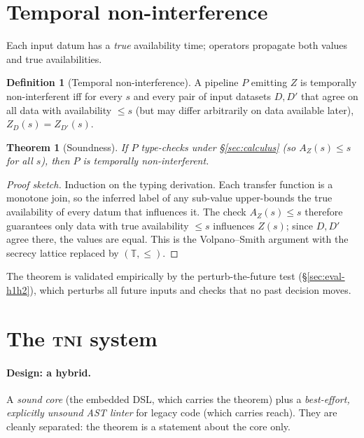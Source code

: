 \documentclass[11pt]{article}
\newcommand{\tni}{\textsc{tni}}
\theoremstyle{plain}
\newtheorem{theorem}{Theorem}
\theoremstyle{definition}
\newtheorem{definition}{Definition}
\begin{document}
\section{Temporal non-interference}\label{sec:theory}

Each input datum has a \emph{true} availability time; operators propagate both
values and true availabilities.

\begin{definition}[Temporal non-interference]
A pipeline $P$ emitting $Z$ is temporally non-interferent iff for every $s$ and
every pair of input datasets $D,D'$ that agree on all data with availability
$\le s$ (but may differ arbitrarily on data available later), $Z_D(s)=Z_{D'}(s)$.
\end{definition}

\begin{theorem}[Soundness]
If $P$ type-checks under \S\ref{sec:calculus} (so $A_Z(s)\le s$ for all $s$),
then $P$ is temporally non-interferent.
\end{theorem}

\begin{proof}[Proof sketch]
Induction on the typing derivation. Each transfer function is a monotone join, so
the inferred label of any sub-value upper-bounds the true availability of every
datum that influences it. The check $A_Z(s)\le s$ therefore guarantees only data
with true availability $\le s$ influences $Z(s)$; since $D,D'$ agree there, the
values are equal. This is the Volpano--Smith argument
\citep{volpano1996sound} with the secrecy lattice replaced by
$(\mathbb{T},\le)$.
\end{proof}

The theorem is validated empirically by the perturb-the-future test
(\S\ref{sec:eval-h1h2}), which perturbs all future inputs and checks that no past
decision moves.

\section{The \textmd{\tni} system}\label{sec:system}

\paragraph{Design: a hybrid.}
A \emph{sound core} (the embedded DSL, which carries the theorem) plus a
\emph{best-effort, explicitly unsound AST linter} for legacy code (which carries
reach). They are cleanly separated: the theorem is a statement about the core
only.
\end{document}
